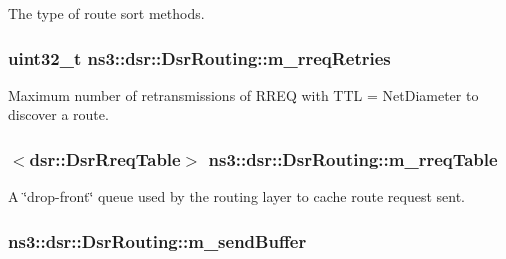 The type of route sort methods. 

\subsubsection[{\texorpdfstring{m\+\_\+rreq\+Retries}{m_rreqRetries}}]{\setlength{\rightskip}{0pt plus 5cm}uint32\+\_\+t ns3\+::dsr\+::\+Dsr\+Routing\+::m\+\_\+rreq\+Retries\hspace{0.3cm}{\ttfamily [private]}}\hypertarget{classns3_1_1dsr_1_1DsrRouting_a88bbff666cd3bb5bad099587a967d547}{}\label{classns3_1_1dsr_1_1DsrRouting_a88bbff666cd3bb5bad099587a967d547}


Maximum number of retransmissions of R\+R\+EQ with T\+TL = Net\+Diameter to discover a route. 

\subsubsection[{\texorpdfstring{m\+\_\+rreq\+Table}{m_rreqTable}}]{$<${\bf dsr\+::\+Dsr\+Rreq\+Table}$>$ ns3\+::dsr\+::\+Dsr\+Routing\+::m\+\_\+rreq\+Table\hspace{0.3cm}{\ttfamily [private]}}\hypertarget{classns3_1_1dsr_1_1DsrRouting_ae9ec27743735fa2d59cc5190961d1942}{}\label{classns3_1_1dsr_1_1DsrRouting_ae9ec27743735fa2d59cc5190961d1942}


A \char`\"{}drop-\/front\char`\"{} queue used by the routing layer to cache route request sent. 

\subsubsection[{\texorpdfstring{m\+\_\+send\+Buffer}{m_sendBuffer}}]{ ns3\+::dsr\+::\+Dsr\+Routing\+::m\+\_\+send\+Buffer\hspace{0.3cm}{\ttfamily [private]}}\hypertarget{classns3_1_1dsr_1_1DsrRouting_a887ae39d7060171753c0605d5c120549}{}\label{classns3_1_1dsr_1_1DsrRouting_a887ae39d7060171753c0605d5c120549}


